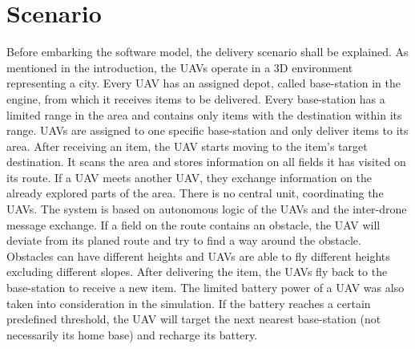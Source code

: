 \section{Scenario}
Before embarking the software model, the delivery scenario shall be explained. As mentioned in the introduction, the UAVs operate in a 3D environment representing a city. Every UAV has an assigned depot, called base-station in the engine, from which it receives items to be delivered. Every base-station has a limited range in the area and contains only items with the destination within its range. UAVs are assigned to one specific base-station and only deliver items to its area. After receiving an item, the UAV starts moving to the item’s target destination. It scans the area and stores information on all fields it has visited on its route. If a UAV meets another UAV, they exchange information on the already explored parts of the area. There is no central unit, coordinating the UAVs. The system is based on autonomous logic of the UAVs and the inter-drone message exchange. If a field on the route contains an obstacle, the UAV will deviate from its planed route and try to find a way around the obstacle. Obstacles can have different heights and UAVs are able to fly different heights excluding different slopes.
After delivering the item, the UAVs fly back to the base-station to receive a new item. The limited battery power of a UAV was also taken into consideration in the simulation. If the battery reaches a certain predefined threshold, the UAV will target the next nearest base-station (not necessarily its home base) and recharge its battery.

